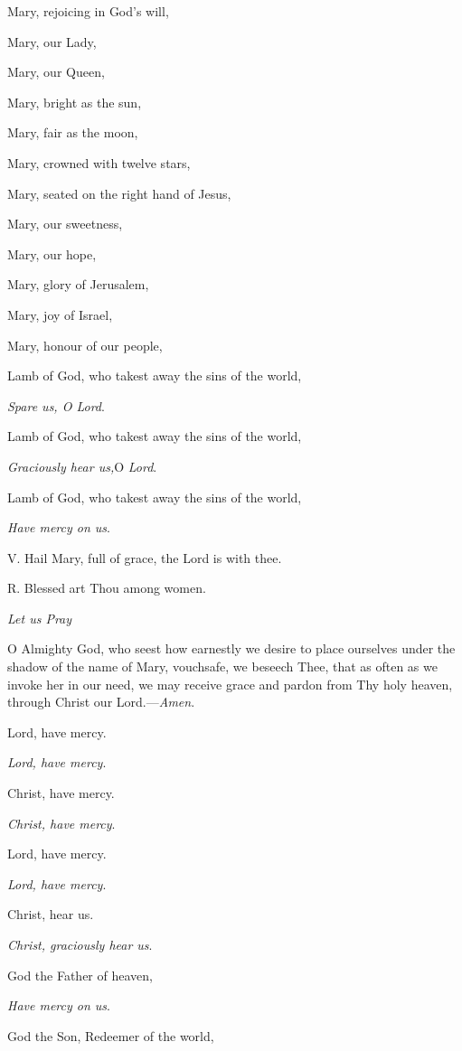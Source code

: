 Mary, rejoicing in God’s will,

Mary, our Lady,

Mary, our Queen,

Mary, bright as the sun,

Mary, fair as the moon,

Mary, crowned with twelve stars,

Mary, seated on the right hand of Jesus,

Mary, our sweetness,

Mary, our hope,

Mary, glory of Jerusalem,

Mary, joy of Israel,

Mary, honour of our people,

Lamb of God, who takest away the
sins of the world,

\emph{Spare us, O Lord}.

Lamb of God, who takest away the sins of the world,

\emph{Graciously hear us,}O \emph{Lord}.

Lamb of God, who takest away the sins of the world,

\emph{Have mercy on us}.

V. Hail Mary, full of grace, the
Lord is with thee.

R. Blessed art Thou among women.

\emph{Let
us Pray}

O Almighty God, who seest how
earnestly we desire to place ourselves under the shadow of the name of
Mary, vouchsafe, we beseech Thee, that as often as we invoke her in our
need, we may receive grace and pardon from Thy holy heaven, through
Christ our Lord.—\emph{Amen}.


Lord, have mercy.

\emph{Lord, have mercy}.

Christ, have mercy.

\emph{Christ, have mercy}.

Lord, have mercy.

\emph{Lord, have mercy}.

Christ, hear us.

\emph{Christ, graciously hear us}.

God the Father of heaven,

\emph{Have mercy on us}.

God the Son, Redeemer of the world,

